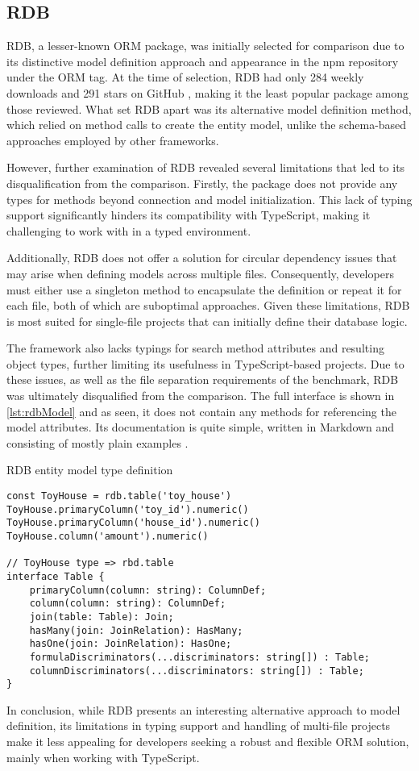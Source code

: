 \subsection{RDB}

RDB, a lesser-known ORM package, was initially selected for comparison due to
its distinctive model definition approach and appearance in the npm repository
under the ORM tag. At the time of selection, RDB had only 284 weekly downloads
\cite{rdbNpm} and 291 stars on GitHub \cite{rdbGitHub}, making it the least
popular package among those reviewed. What set RDB apart was its alternative
model definition method, which relied on method calls to create the entity
model, unlike the schema-based approaches employed by other frameworks.

However, further examination of RDB revealed several limitations that led to its
disqualification from the comparison. Firstly, the package does not provide any
types for methods beyond connection and model initialization. This lack of
typing support significantly hinders its compatibility with TypeScript, making
it challenging to work with in a typed environment.

Additionally, RDB does not offer a solution for circular dependency issues that
may arise when defining models across multiple files. Consequently, developers
must either use a singleton method to encapsulate the definition or repeat it
for each file, both of which are suboptimal approaches. Given these limitations,
RDB is most suited for single-file projects that can initially define their
database logic.

The framework also lacks typings for search method attributes and resulting
object types, further limiting its usefulness in TypeScript-based projects. Due
to these issues, as well as the file separation requirements of the benchmark,
RDB was ultimately disqualified from the comparison. The full interface is shown
in \autoref{lst:rdbModel} and as seen, it does not contain any methods for
referencing the model attributes. Its documentation is quite simple, written in
Markdown and consisting of mostly plain examples \cite{rdbDocs}.

\begin{listing}
\caption{RDB entity model type definition}
\label{lst:rdbModel}
\begin{verbatim}
const ToyHouse = rdb.table('toy_house')
ToyHouse.primaryColumn('toy_id').numeric()
ToyHouse.primaryColumn('house_id').numeric()
ToyHouse.column('amount').numeric()

// ToyHouse type => rbd.table
interface Table {
    primaryColumn(column: string): ColumnDef;
    column(column: string): ColumnDef;
    join(table: Table): Join;
    hasMany(join: JoinRelation): HasMany;
    hasOne(join: JoinRelation): HasOne;
    formulaDiscriminators(...discriminators: string[]) : Table;
    columnDiscriminators(...discriminators: string[]) : Table;
}
\end{verbatim}
\end{listing}

In conclusion, while RDB presents an interesting alternative approach to model
definition, its limitations in typing support and handling of multi-file
projects make it less appealing for developers seeking a robust and flexible ORM
solution, mainly when working with TypeScript.